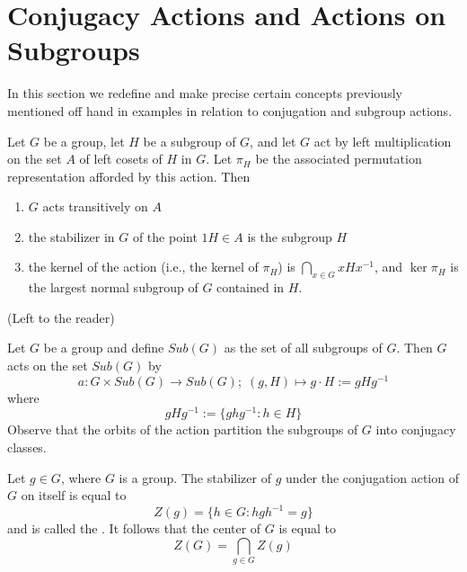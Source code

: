 \documentclass[12pt, a4paper, twoside, openright, titlepage]{book}
\begin{document}
\section{\textsection Conjugacy Actions and Actions on Subgroups}

In this section we redefine and make precise certain concepts previously mentioned off hand in examples in relation to conjugation and subgroup actions.


\begin{thm}{}{}
    Let $G$ be a group, let $H$ be a subgroup of $G$, and let $G$ act by left multiplication on the set $A$ of left cosets of $H$ in $G$. Let $\pi_H$ be the associated permutation representation afforded by this action. Then \begin{enumerate}
        \item $G$ acts transitively on $A$
        \item the stabilizer in $G$ of the point $1H \in A$ is the subgroup $H$
        \item the kernel of the action (i.e., the kernel of $\pi_H$) is $\bigcap_{x\in G}xHx^{-1}$, and $\ker \pi_H$ is the largest normal subgroup of $G$ contained in $H$.
    \end{enumerate}
\end{thm}
\begin{proof*}{}{}
    (Left to the reader)
\end{proof*}

\begin{defn}{}{}
    Let $G$ be a group and define $Sub(G)$ as the set of all subgroups of $G$. Then $G$ acts on the set $Sub(G)$ by \begin{equation*}
        a:G\times Sub(G)\rightarrow Sub(G);\;(g,H) \mapsto g\cdot H:= gHg^{-1}
    \end{equation*}
    where \begin{equation*}
        gHg^{-1} := \{ghg^{-1}:h \in H\}
    \end{equation*}
    Observe that the orbits of the action partition the subgroups of $G$ into conjugacy classes.
\end{defn}


\begin{defn}{}{}
    Let $g \in G$, where $G$ is a group. The stabilizer of $g$ under the conjugation action of $G$ on itself is equal to \begin{equation*}
        Z(g) = \{h \in G: hgh^{-1} = g\}
    \end{equation*}
    and is called the . It follows that the center of $G$ is equal to \begin{equation*}
        Z(G) = \bigcap\limits_{g\in G}Z(g)
    \end{equation*}
\end{defn}
\end{document}
